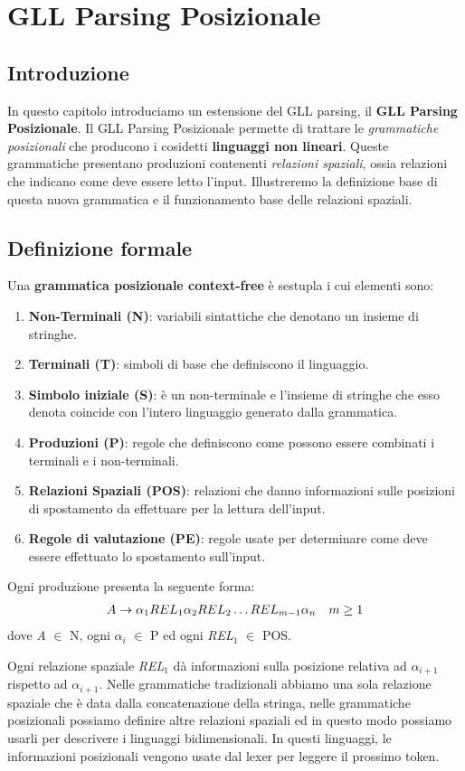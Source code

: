 \chapter{GLL Parsing Posizionale}
\section{Introduzione}
In questo capitolo introduciamo un estensione del GLL parsing, il \textbf{GLL Parsing Posizionale}. Il GLL Parsing Posizionale permette di trattare le \textit{grammatiche posizionali} che producono i cosidetti \textbf{linguaggi non lineari}. Queste grammatiche presentano produzioni contenenti \textit{relazioni spaziali}, ossia relazioni che indicano come deve essere letto l'input. Illustreremo la definizione base di questa nuova grammatica e il funzionamento base delle relazioni spaziali.
\section{Definizione formale}
Una \textbf{grammatica posizionale context-free} è sestupla \cite{pubblicazione: tomita} i cui elementi sono:
\begin{enumerate}
	\item \textbf{Non-Terminali (N)}: variabili sintattiche che denotano un insieme di stringhe.
	\item \textbf{Terminali (T)}: simboli di base che definiscono il linguaggio.
	\item \textbf{Simbolo iniziale (S)}: è un non-terminale e l'insieme di stringhe che esso denota coincide con l'intero linguaggio generato dalla grammatica.
	\item \textbf{Produzioni (P)}: regole che definiscono come possono essere combinati i terminali e i non-terminali.
	\item \textbf{Relazioni Spaziali (POS)}: relazioni che danno informazioni sulle posizioni di spostamento da effettuare per la lettura dell'input.
	\item \textbf{Regole di valutazione (PE)}: regole usate per determinare come deve essere effettuato lo spostamento sull'input.
\end{enumerate}
Ogni produzione presenta la seguente forma:
\begin{align}
	A \to \alpha_{1} REL_1 \alpha_{2} REL_2 \dots REL_{m-1} \alpha_{n} \quad m \ge 1 \notag 
\end{align}
dove \textit{A} $\in$ N, ogni $\alpha_i$ $\in$ P ed ogni \textit{REL}$_1$ $\in$ POS.\par
\vspace{0.3cm}
\noindent Ogni relazione spaziale \textit{REL}$_1$ dà informazioni sulla posizione relativa ad $\alpha_{i+1}$ rispetto ad $\alpha_{i+1}$. Nelle grammatiche tradizionali abbiamo una sola relazione spaziale che è data dalla concatenazione della stringa, nelle grammatiche posizionali possiamo definire altre relazioni spaziali ed in questo modo possiamo usarli per descrivere i linguaggi bidimensionali. In questi linguaggi, le informazioni posizionali vengono usate dal lexer per leggere il prossimo token.
